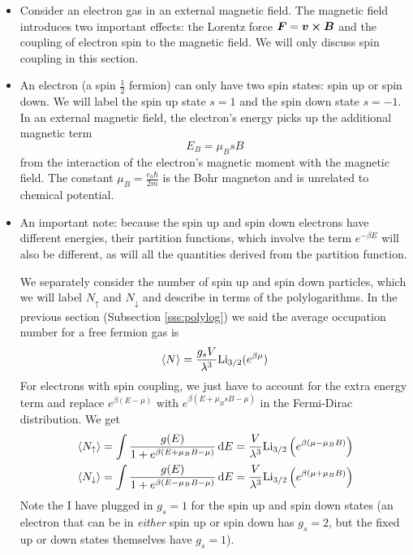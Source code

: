 \documentclass[11pt, a4paper]{article}
\newcommand{\diff}{\mathop{}\!\mathrm{d}} %
\begin{document}
\begin{itemize}
	\item Consider an electron gas in an external magnetic field. The magnetic field introduces two important effects: the Lorentz force $ \bm{F} = \bm{v} \cross \bm{B} $ and the coupling of electron spin to the magnetic field. We will only discuss spin coupling in this section.
	
	\item An electron (a spin $ \frac{1}{2} $ fermion) can only have two spin states: spin up or spin down. We will label the spin up state $ s = 1 $ and the spin down state $ s = -1 $. In an external magnetic field, the electron's energy picks up the additional magnetic term
	\begin{equation*}
		E_{B} = \mu_{B} s B
	\end{equation*}
	from the interaction of the electron's magnetic moment with the magnetic field. The constant $ \mu_{B} = \frac{e_{0}\hbar}{2m} $ is the Bohr magneton and is unrelated to chemical potential.
	
	\item An important note: because the spin up and spin down electrons have different energies, their partition functions, which involve the term $ e^{-\beta E} $ will also be different, as will all the quantities derived from the partition function. 
	
	We separately consider the number of spin up and spin down particles, which we will label $ N_{\uparrow} $ and $ N_{\downarrow} $ and describe in terms of the polylogarithms. In the previous section (Subsection \ref{sss:polylog}) we said the average occupation number for a free fermion gas is
	\begin{equation*}
		\expval{N} = \frac{g_{s}V}{\lambda^{3}}\mathrm{Li}_{3/2}(e^{\beta \mu})
	\end{equation*}
	For electrons with spin coupling, we just have to account for the extra energy term and replace $ e^{\beta(E - \mu)} $ with $ e^{\beta(E + \mu_{B}sB- \mu) } $ in the Fermi-Dirac distribution. We get
	\begin{align*}
		&\expval{N_{\uparrow}} = \int  \frac{g(E)}{1 + e^{\beta (E + \mu_{B}B - \mu)}}  \diff E = \frac{V}{\lambda^{3}}\mathrm{Li}_{3/2}\left (e^{\beta(\mu - \mu_{B}B)}\right )\\
		&\expval{N_{\downarrow}} = \int  \frac{g(E)}{1 + e^{\beta (E - \mu_{B}B - \mu)}}  \diff E =  \frac{V}{\lambda^{3}}\mathrm{Li}_{3/2}\left (e^{\beta(\mu + \mu_{B}B)}\right )
	\end{align*}
	Note the I have plugged in $ g_{s} = 1 $ for the spin up and spin down states (an electron that can be in \textit{either} spin up or spin down has $ g_{s} = 2$, but the fixed up or down states themselves have $ g_{s} = 1 $).
	

\end{itemize}
\end{document}
